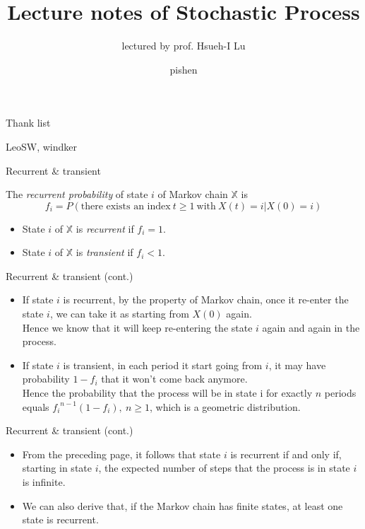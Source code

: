 \documentclass[mathserif]{beamer}
\title[Stochastic Process]{Lecture notes of Stochastic Process}
\subtitle{lectured by prof. Hsueh-I Lu}
\author{pishen}
\institute[AlgoLab]{AlgoLab, CSIE, NTU}
\begin{document}
\begin{frame}[plain]
	\titlepage
\end{frame}

\begin{frame}{Thank list}
\begin{center}
LeoSW, windker
\end{center}
\end{frame}

\begin{frame}{Recurrent \& transient}
	\begin{definition}
	The \textit{recurrent probability} of state $i$ of Markov chain $\mathbb{X}$ is 
	\[
	f_i = P(\text{there exists an index}~t \geq 1~\text{with}~X(t)=i | X(0)=i)
	\]
	\begin{itemize}
	\item State $i$ of $\mathbb{X}$ is \textit{recurrent} if $f_i = 1$.
	\item State $i$ of $\mathbb{X}$ is \textit{transient} if $f_i < 1$.
	\end{itemize}
	\end{definition}
\end{frame}

\begin{frame}{Recurrent \& transient (cont.)}
	\begin{itemize}
	\item If state $i$ is recurrent, by the property of Markov chain, 
		once it re-enter the state $i$, we can take it as starting from $X(0)$ again. \\
		Hence we know that it will keep re-entering the state $i$ again and again in the process.
	\item If state $i$ is transient, in each period it start going from $i$,
		it may have probability $1 - f_i$ that it won't come back anymore. \\
		Hence the probability that the process will be in state i for exactly $n$ periods equals
		${f_i}^{n-1}(1-f_i), ~n \geq 1$, which is a geometric distribution.
	\end{itemize}
\end{frame}

\begin{frame}{Recurrent \& transient (cont.)}
	\begin{itemize}
	\item From the preceding page, it follows that state $i$ is recurrent if and only if,
		starting in state $i$, the expected number of steps that the process is in state $i$ is infinite.
	\item We can also derive that, if the Markov chain has finite states, at least one state is recurrent.
	\end{itemize}
\end{frame}
\end{document}
